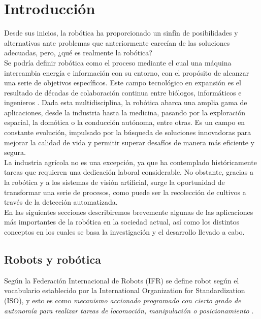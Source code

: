 \chapter{Introducción}
\label{cap:capitulo1}
\setcounter{page}{1}

Desde sus inicios, la robótica ha proporcionado un sinfín de posibilidades y alternativas ante problemas que anteriormente carecían de las soluciones adecuadas, pero, ¿qué es realmente la robótica?\\

Se podría definir robótica como el proceso mediante el cual una máquina intercambia energía e información con su entorno, con el propósito de alcanzar una serie de objetivos específicos. Este campo tecnológico en expansión es el resultado de décadas de colaboración continua entre biólogos, informáticos e ingenieros \cite{Koditschek21}. Dada esta multidisciplina, la robótica abarca una amplia gama de aplicaciones, desde la industria hasta la medicina, pasando por la exploración espacial, la domótica o la conducción autónoma, entre otras. Es un campo en constante evolución, impulsado por la búsqueda de soluciones innovadoras para mejorar la calidad de vida y permitir superar desafíos de manera más eficiente y segura.\\

La industria agrícola no es una excepción, ya que ha contemplado históricamente tareas que requieren una dedicación laboral considerable. No obstante, gracias a la robótica y a los sistemas de visión artificial, surge la oportunidad de transformar una serie de procesos, como puede ser la recolección de cultivos a través de la detección automatizada.\\

En las siguientes secciones describiremos brevemente algunas de las aplicaciones más importantes de la robótica en la sociedad actual, así como los distintos conceptos en los cuales se basa la investigación y el desarrollo llevado a cabo.\\

\section{Robots y robótica}
\label{sec:robótica} %

Según la Federación Internacional de Robots (IFR) se define robot según el vocabulario establecido por la International Organization for Standardization (ISO), y esto es como \textit{mecanismo accionado programado con cierto grado de autonomía para realizar tareas de locomoción, manipulación o posicionamiento} \cite{ISO8373}.\\  


